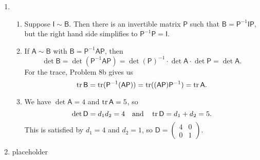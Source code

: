 \begin{enumerate}
\begin{enumerate}
\end{enumerate}
\item \begin{enumerate}
\item Suppose $\mathsf{I}\sim\mathsf{B}$. Then there is an invertible matrix $\mathsf{P}$ such that $\mathsf{B} = \mathsf{P}^{-1}\mathsf{IP}$, but the right hand side simplifies to $\mathsf{P}^{-1}\mathsf{P} = \mathsf{I}$.
\item If $\mathsf{A}\sim\mathsf{B}$ with $\mathsf{B} = \mathsf{P}^{-1}\mathsf{AP}$, then
\begin{equation*}
\det\mathsf{B} = \det(\mathsf{P}^{-1}\mathsf{AP}) = \det(\mathsf{P})^{-1}\cdot\det\mathsf{A}\cdot\det\mathsf{P} = \det\mathsf{A}.
\end{equation*}
For the trace, Problem 8b gives us
\begin{equation*}
\operatorname{tr}\mathsf{B} = \operatorname{tr}(\mathsf{P}^{-1}(\mathsf{AP})) = \operatorname{tr}((\mathsf{AP})\mathsf{P}^{-1}) = \operatorname{tr}\mathsf{A}.
\end{equation*}
\item We have $\det\mathsf{A} = 4$ and $\operatorname{tr}\mathsf{A} = 5$, so
\begin{equation*}
\det\mathsf{D} = d_1d_2 = 4\quad\text{and}\quad\operatorname{tr}\mathsf{D} = d_1 + d_2 = 5.
\end{equation*}
This is satisfied by $d_1 = 4$ and $d_2 = 1$, so $\mathsf{D} = \begin{pmatrix} 4 & 0 \\ 0 & 1 \end{pmatrix}$.
\end{enumerate}
\item placeholder
\end{enumerate}